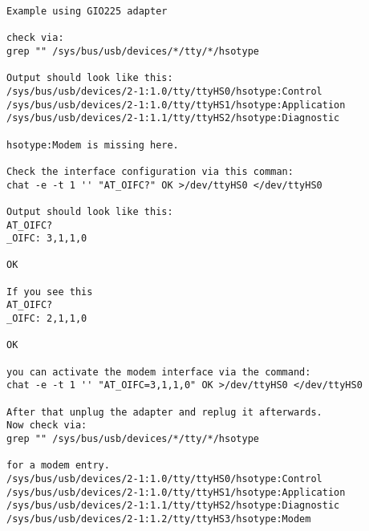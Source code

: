 \begin{verbatim}
Example using GIO225 adapter

check via:
grep "" /sys/bus/usb/devices/*/tty/*/hsotype

Output should look like this:
/sys/bus/usb/devices/2-1:1.0/tty/ttyHS0/hsotype:Control
/sys/bus/usb/devices/2-1:1.0/tty/ttyHS1/hsotype:Application
/sys/bus/usb/devices/2-1:1.1/tty/ttyHS2/hsotype:Diagnostic

hsotype:Modem is missing here.

Check the interface configuration via this comman:
chat -e -t 1 '' "AT_OIFC?" OK >/dev/ttyHS0 </dev/ttyHS0

Output should look like this:
AT_OIFC?
_OIFC: 3,1,1,0

OK

If you see this
AT_OIFC?
_OIFC: 2,1,1,0

OK

you can activate the modem interface via the command:
chat -e -t 1 '' "AT_OIFC=3,1,1,0" OK >/dev/ttyHS0 </dev/ttyHS0

After that unplug the adapter and replug it afterwards.
Now check via:
grep "" /sys/bus/usb/devices/*/tty/*/hsotype

for a modem entry.
/sys/bus/usb/devices/2-1:1.0/tty/ttyHS0/hsotype:Control
/sys/bus/usb/devices/2-1:1.0/tty/ttyHS1/hsotype:Application
/sys/bus/usb/devices/2-1:1.1/tty/ttyHS2/hsotype:Diagnostic
/sys/bus/usb/devices/2-1:1.2/tty/ttyHS3/hsotype:Modem
\end{verbatim}
